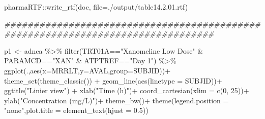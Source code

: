 \documentclass[
  letterpaper,
  DIV=11,
  numbers=noendperiod]{scrreprt}
\newenvironment{Shaded}{\begin{snugshade}}{\end{snugshade}}
\newcommand{\AttributeTok}[1]{\textcolor[rgb]{0.40,0.45,0.13}{#1}}
\newcommand{\DecValTok}[1]{\textcolor[rgb]{0.68,0.00,0.00}{#1}}
\newcommand{\DocumentationTok}[1]{\textcolor[rgb]{0.37,0.37,0.37}{\textit{#1}}}
\newcommand{\FloatTok}[1]{\textcolor[rgb]{0.68,0.00,0.00}{#1}}
\newcommand{\FunctionTok}[1]{\textcolor[rgb]{0.28,0.35,0.67}{#1}}
\newcommand{\NormalTok}[1]{\textcolor[rgb]{0.00,0.23,0.31}{#1}}
\newcommand{\OtherTok}[1]{\textcolor[rgb]{0.00,0.23,0.31}{#1}}
\newcommand{\SpecialCharTok}[1]{\textcolor[rgb]{0.37,0.37,0.37}{#1}}
\newcommand{\StringTok}[1]{\textcolor[rgb]{0.13,0.47,0.30}{#1}}
\begin{document}
\begin{Shaded}
\begin{Highlighting}[]
\NormalTok{pharmaRTF}\SpecialCharTok{::}\FunctionTok{write\_rtf}\NormalTok{(doc, }\AttributeTok{file=}\StringTok{\textquotesingle{}./output/table14.2.01.rtf\textquotesingle{}}\NormalTok{)}














\DocumentationTok{\#\#\#\#\#\#\#\#\#\#\#\#\#\#\#\#\#\#\#\#\#\#\#\#\#\#\#\#\#\#\#\#\#\#\#\#\#\#\#\#\#\#\#\#\#\#\#\#\#\#\#\#\#\#\#\#\#\#\#\#\#\#\#\#\#\#\#\#\#\#\#\#\#\#\#\#\#\#\#\#}

\NormalTok{p1 }\OtherTok{\textless{}{-}}\NormalTok{ adnca }\SpecialCharTok{\%\textgreater{}\%} 
  \FunctionTok{filter}\NormalTok{(TRT01A}\SpecialCharTok{==}\StringTok{"Xanomeline Low Dose"} \SpecialCharTok{\&} 
\NormalTok{        PARAMCD}\SpecialCharTok{==}\StringTok{"XAN"} \SpecialCharTok{\&}\NormalTok{ ATPTREF}\SpecialCharTok{==}\StringTok{"Day 1"}\NormalTok{) }\SpecialCharTok{\%\textgreater{}\%}
  \FunctionTok{ggplot}\NormalTok{(.,}\FunctionTok{aes}\NormalTok{(}\AttributeTok{x=}\NormalTok{MRRLT,}\AttributeTok{y=}\NormalTok{AVAL,}\AttributeTok{group=}\NormalTok{SUBJID))}\SpecialCharTok{+}
  \FunctionTok{theme\_set}\NormalTok{(}\FunctionTok{theme\_classic}\NormalTok{()) }\SpecialCharTok{+}
  \FunctionTok{geom\_line}\NormalTok{(}\FunctionTok{aes}\NormalTok{(}\AttributeTok{linetype =}\NormalTok{ SUBJID))}\SpecialCharTok{+}
  \FunctionTok{ggtitle}\NormalTok{(}\StringTok{"Linier view"}\NormalTok{) }\SpecialCharTok{+}
  \FunctionTok{xlab}\NormalTok{(}\StringTok{"Time (h)"}\NormalTok{)}\SpecialCharTok{+}
  \FunctionTok{coord\_cartesian}\NormalTok{(}\AttributeTok{xlim =} \FunctionTok{c}\NormalTok{(}\DecValTok{0}\NormalTok{, }\DecValTok{25}\NormalTok{))}\SpecialCharTok{+}
  \FunctionTok{ylab}\NormalTok{(}\StringTok{"Concentration (mg/L)"}\NormalTok{)}\SpecialCharTok{+}
  \FunctionTok{theme\_bw}\NormalTok{()}\SpecialCharTok{+} 
  \FunctionTok{theme}\NormalTok{(}\AttributeTok{legend.position =} \StringTok{"none"}\NormalTok{,}\AttributeTok{plot.title =} \FunctionTok{element\_text}\NormalTok{(}\AttributeTok{hjust =} \FloatTok{0.5}\NormalTok{)) }


\end{Highlighting}
\end{Shaded}
\end{document}
